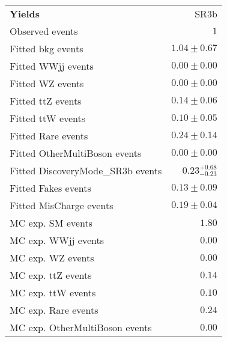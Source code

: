 \begin{table}
\begin{center}
\setlength{\tabcolsep}{0.0pc}
{\small
\begin{tabular*}{\textwidth}{@{\extracolsep{\fill}}lr}
\noalign{\smallskip}\hline\noalign{\smallskip}
{\bf Yields}           & SR3b              \\[-0.05cm]
\noalign{\smallskip}\hline\noalign{\smallskip}
Observed events          & $1$                    \\
\noalign{\smallskip}\hline\noalign{\smallskip}
Fitted bkg events         & $1.04 \pm 0.67$              \\
\noalign{\smallskip}\hline\noalign{\smallskip}
        Fitted WWjj events         & $0.00 \pm 0.00$              \\
        Fitted WZ events         & $0.00 \pm 0.00$              \\
        Fitted ttZ events         & $0.14 \pm 0.06$              \\
        Fitted ttW events         & $0.10 \pm 0.05$              \\
        Fitted Rare events         & $0.24 \pm 0.14$              \\
        Fitted OtherMultiBoson events         & $0.00 \pm 0.00$              \\
        Fitted DiscoveryMode\_SR3b events         & $0.23_{-0.23}^{+0.68}$              \\
        Fitted Fakes events         & $0.13 \pm 0.09$              \\
        Fitted MisCharge events         & $0.19 \pm 0.04$              \\
 \noalign{\smallskip}\hline\noalign{\smallskip}
MC exp. SM events              & $1.80$              \\
\noalign{\smallskip}\hline\noalign{\smallskip}
        MC exp. WWjj events         & $0.00$              \\
        MC exp. WZ events         & $0.00$              \\
        MC exp. ttZ events         & $0.14$              \\
        MC exp. ttW events         & $0.10$              \\
        MC exp. Rare events         & $0.24$              \\
        MC exp. OtherMultiBoson events         & $0.00$              \\

\end{tabular*}}
\end{center}
\end{table}
